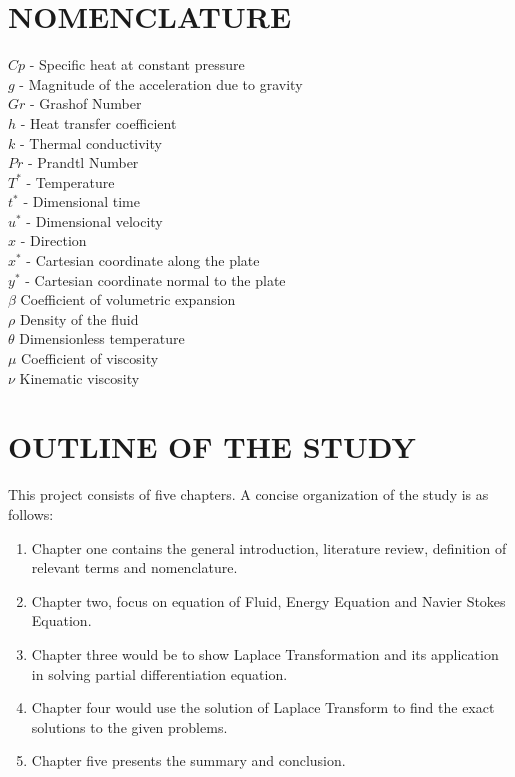 \documentclass[11pt]{report}
\begin{document}
	\section{NOMENCLATURE}
	$Cp$ - Specific heat at constant pressure\\
	$g$ - Magnitude of the acceleration due to gravity\\
	$Gr$ - Grashof Number\\
	$h$ - Heat transfer coefficient\\
	$k$ - Thermal conductivity\\
	$Pr$ - Prandtl Number\\
	$T^*$ - Temperature\\
	$t^*$ - Dimensional time\\
	$u^*$ - Dimensional velocity\\
	$x$ - Direction \\
	$x^*$ - Cartesian coordinate along the plate\\
	$y^*$ - Cartesian coordinate normal to the plate\\
	$\beta$ Coefficient of volumetric expansion\\
	$\rho$ Density of the fluid\\
	$\theta$ Dimensionless temperature\\
	$\mu$ Coefficient of viscosity\\
	$\nu$ Kinematic viscosity\\
	
	
	
	\section{OUTLINE OF THE STUDY}
	This project consists of five chapters. A concise organization of the study is as follows:
	\begin{enumerate}
		\item Chapter one contains the general introduction, literature review, definition of relevant terms and nomenclature.
		
		\item Chapter two, focus on equation of Fluid, Energy Equation and Navier Stokes Equation. 
		
		\item Chapter three would be to show Laplace Transformation and its application in solving partial differentiation equation.
		
		\item Chapter four would use the solution of Laplace Transform to find the exact solutions to the given problems.
		
		\item Chapter five presents the summary and conclusion.
	\end{enumerate}	
\end{document}
